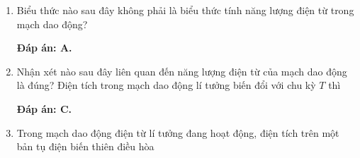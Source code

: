 \begin{enumerate}[label=\bfseries Câu \arabic*:]
{		Năng lượng điện trường và năng lượng từ trường cùng biến thiên tuần hoàn theo một tần số chung và gấp đôi tần số của dao động điện từ do đó B sai. 
		
	}
	\item {}
	
	{
		Biểu thức nào sau đây không phải là biểu thức tính năng lượng điện từ trong mạch dao động?
	}
	
	\hideall
	{		\textbf{Đáp án: A.}
		
		
		
	}
	\item {}
	
	{Nhận xét nào sau đây liên quan đến năng lượng điện từ của mạch dao động là đúng? Điện tích trong mạch dao động lí tưởng biến đổi với chu kỳ $T$ thì
		
		
	}
	
	\hideall
	{		\textbf{Đáp án: C.}
		
		
		
	}
	
	\item {}
	
	{Trong mạch dao động điện từ lí tưởng đang hoạt động, điện tích trên một bản tụ điện biến thiên điều hòa
	}
	

\end{enumerate}
